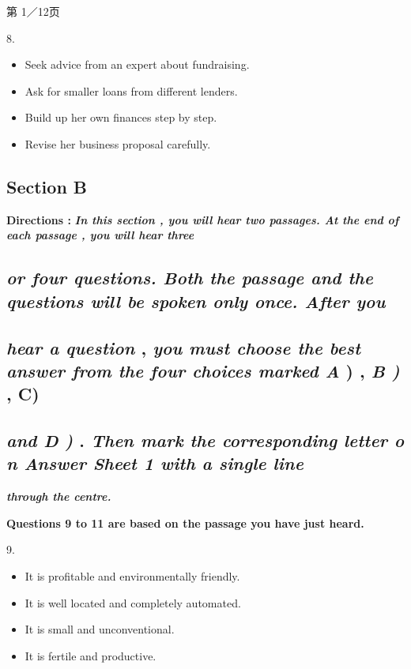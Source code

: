 \documentclass[UTF8,11pt]{ctexart}
\begin{document}
第 1／12页


8.


\begin{itemize}[leftmargin=2em,itemsep=.2em,topsep=.4em]\item[A.] Seek advice from an expert about fundraising.
\item[B.] Ask for smaller loans from different lenders.
\item[C.] Build up her own finances step by step.
\item[D.] Revise her business proposal carefully.
\end{itemize}

\subsection*{\textbf{Section B}}


\textbf{Directions : }\textbf{\textit{In this section , you will hear two passages. At the end of each passage , you will hear three}}


\subsection*{\textbf{\textit{or four questions. Both the passage and the questions will be spoken only once. After you}}}


\subsection*{\textbf{\textit{hear a question }}, \textbf{\textit{you must choose the best answer from the four choices marked A }}) , \textbf{\textit{B ) }}, C)}


\subsection*{\textbf{\textit{and D ) }}. \textbf{\textit{Then mark the corresponding letter o}} \textbf{\textit{n Answer Sheet 1 with a single line}}}


\textbf{\textit{through the centre.}}


\textbf{Questions 9 to 11 are based on the passage you have just heard.}


9.


\begin{itemize}[leftmargin=2em,itemsep=.2em,topsep=.4em]\item[A.] It is profitable and environmentally friendly.
\item[B.] It is well located and completely automated.
\item[C.] It is small and unconventional.
\item[D.] It is fertile and productive.
\end{itemize}
\end{document}
